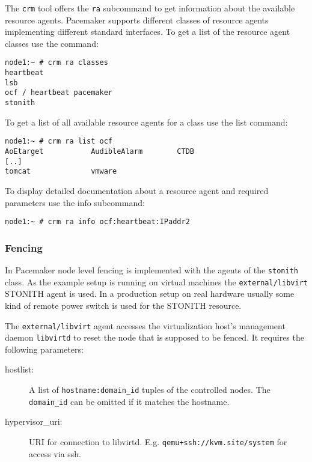 \documentclass[a4paper,11pt,DIV=12]{scrartcl}
\begin{document}
    The \verb|crm| tool offers the \verb|ra| subcommand to get information
    about the available resource agents. Pacemaker supports different classes
    of resource agents implementing different standard interfaces. To get a
    list of the resource agent classes use the command:
    \begin{verbatim}
node1:~ # crm ra classes
heartbeat
lsb
ocf / heartbeat pacemaker
stonith
    \end{verbatim}
    To get a list of all available resource agents for a class use the list
    command:
    \begin{verbatim}
node1:~ # crm ra list ocf
AoEtarget           AudibleAlarm        CTDB
[..]
tomcat              vmware
    \end{verbatim}

    To display detailed documentation about a resource agent and required
    parameters use the info subcommand:
    \begin{verbatim}
node1:~ # crm ra info ocf:heartbeat:IPaddr2
    \end{verbatim}

\subsubsection{Fencing}
    In Pacemaker node level fencing is implemented with the agents of the
    \verb|stonith| class. As the example setup is running on virtual machines
    the \verb|external/libvirt| STONITH agent is used. In a production setup on
    real hardware usually some kind of remote power switch is used for the
    STONITH resource.

    The  \verb|external/libvirt| agent accesses the virtualization host's
    management daemon \verb|libvirtd| to reset the node that is supposed to be
    fenced. It requires the following parameters:

    \begin{description}
        \item[hostlist:] A list of \verb|hostname:domain_id| tuples of the
            controlled nodes. The \verb|domain_id| can be omitted if it
            matches the hostname.
        \item[hypervisor\_uri:] URI for connection to libvirtd. E.g.
               \verb|qemu+ssh://kvm.site/system| for access via ssh.
    \end{description}
\end{document}
